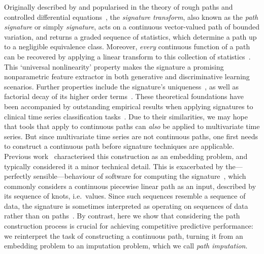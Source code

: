 \documentclass{article}
\begin{document}
Originally described by \citet{Chen54, Chen57, Chen58} and popularised
in the theory of rough paths and controlled differential
equations~\cite{lyons1998differential, FritzVictoir10, lyons2014rough},
the \emph{signature transform}, also known as the \emph{path signature}
or simply \emph{signature}, acts on a continuous vector-valued path of
bounded variation, and returns a graded sequence of statistics, which
determine a path up to a negligible equivalence class. Moreover,
\emph{every} continuous function of a path can be recovered by applying
a linear transform to this collection of statistics~\citep[Proposition
A.6]{kidger2019deep}.
%
This `universal nonlinearity' property makes the signature a promising nonparametric
feature extractor in both generative and
discriminative learning scenarios.
%
Further properties include the signature's uniqueness~\citep{hambly2010uniqueness}, as well as factorial decay of its higher order terms~\citep{lyons1998differential}. These theoretical foundations have been accompanied by outstanding empirical results when applying signatures to clinical time series classification tasks~\citep{reyna2019early, morrill2019signature}.
Due to their similarities, we may hope that tools that
apply to continuous paths can \emph{also} be applied to multivariate
time series. But since multivariate time series are not continuous
paths, one first needs to construct a continuous path before signature techniques are applicable.
%
Previous work~\citep{levin2013, kidger2019deep, fermanian2019embedding}
characterised this construction as an embedding problem, and
typically considered it a minor technical detail.
This is exacerbated by the---perfectly sensible---behaviour of software
for computing the signature~\citep{iisignature, signatory}, which
commonly considers a continuous piecewise linear path as an input,
described by its sequence of knots, i.e.\ values.
%
Since such sequences resemble a sequence of data, the signature is
sometimes interpreted as operating on sequences of data rather than on
paths~\cite{kidger2019deep, levin2013}.
%
By contrast, here we show that considering the path construction
process is crucial for achieving competitive predictive
performance: we reinterpret the task of constructing a continuous path,
turning it from an embedding problem to an imputation problem, which we
call \emph{path imputation}.
%
\end{document}
